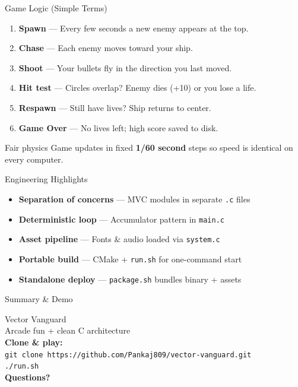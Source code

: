 \documentclass[aspectratio=169,10pt]{beamer}
\begin{document}
\begin{frame}{Game Logic (Simple Terms)}
  \begin{enumerate}
    \item \textbf{Spawn} --- Every few seconds a new enemy appears at the top.
    \item \textbf{Chase} --- Each enemy moves toward your ship.
    \item \textbf{Shoot} --- Your bullets fly in the direction you last moved.
    \item \textbf{Hit test} --- Circles overlap? Enemy dies (+10) or you lose a life.
    \item \textbf{Respawn} --- Still have lives? Ship returns to center.
    \item \textbf{Game Over} --- No lives left; high score saved to disk.
  \end{enumerate}
  \vspace{0.2cm}
  \begin{block}{Fair physics}
    Game updates in fixed \textbf{1/60 second} steps so speed is identical on every computer.
  \end{block}
\end{frame}

\begin{frame}{Engineering Highlights}
  \begin{itemize}
    \item \textbf{Separation of concerns} --- MVC modules in separate \texttt{.c} files
    \item \textbf{Deterministic loop} --- Accumulator pattern in \texttt{main.c}
    \item \textbf{Asset pipeline} --- Fonts \& audio loaded via \texttt{system.c}
    \item \textbf{Portable build} --- CMake + \texttt{run.sh} for one-command start
    \item \textbf{Standalone deploy} --- \texttt{package.sh} bundles binary + assets
  \end{itemize}
\end{frame}

\begin{frame}{Summary \& Demo}
  \begin{center}
    {\Large Vector Vanguard}\\[0.4cm]
    Arcade fun + clean C architecture\\[0.6cm]
    \textbf{Clone \& play:}\\
    \texttt{git clone https://github.com/Pankaj809/vector-vanguard.git}\\
    \texttt{./run.sh}\\[0.6cm]
    \textbf{Questions?}
  \end{center}
\end{frame}
\end{document}
